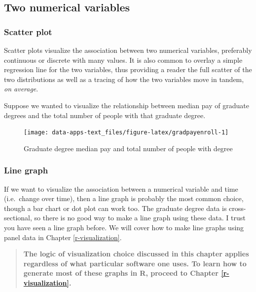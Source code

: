 \documentclass[
]{book}
\begin{document}
\hypertarget{two-numerical-variables}{%
\subsection{Two numerical variables}\label{two-numerical-variables}}

\hypertarget{scatter-plot}{%
\subsubsection{Scatter plot}\label{scatter-plot}}

Scatter plots visualize the association between two numerical variables, preferably continuous or discrete with many values. It is also common to overlay a simple regression line for the two variables, thus providing a reader the full scatter of the two distributions as well as a tracing of how the two variables move in tandem, \emph{on average}.

Suppose we wanted to visualize the relationship between median pay of graduate degrees and the total number of people with that graduate degree.

\begin{figure}

{\centering \texttt{[image: data-apps-text\_files/figure-latex/gradpayenroll-1]} 

}

\caption{Graduate degree median pay and total number of people with degree}\label{fig:gradpayenroll}
\end{figure}

\hypertarget{line-graph}{%
\subsubsection{Line graph}\label{line-graph}}

If we want to visualize the association between a numerical variable and time (i.e.~change over time), then a line graph is probably the most common choice, though a bar chart or dot plot can work too. The graduate degree data is cross-sectional, so there is no good way to make a line graph using these data. I trust you have seen a line graph before. We will cover how to make line graphs using panel data in Chapter \ref{r-visualization}.

\begin{quote}
\textbf{The logic of visualization choice discussed in this chapter applies regardless of what particular software one uses. To learn how to generate most of these graphs in R, proceed to Chapter \ref{r-visualization}.}
\end{quote}
\end{document}
